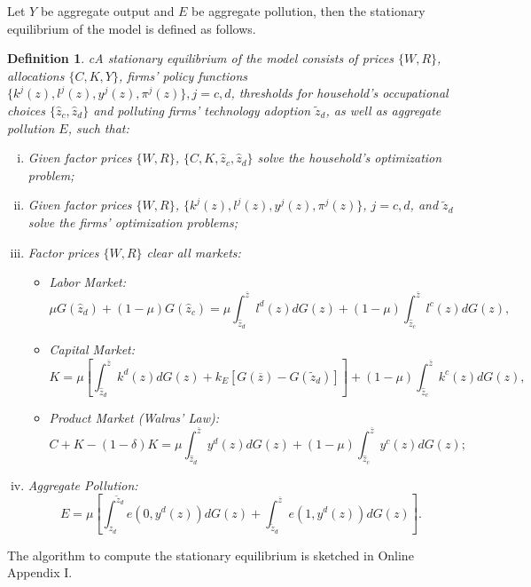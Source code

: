 \documentclass[AEJ]{AEA}
\newtheorem{definition}{Definition}
\begin{document}
Let $Y$ be aggregate output and $E$ be aggregate pollution, then the stationary equilibrium of the model is defined as follows.
\begin{definition}
\label{def:ge}
cA stationary equilibrium of the model consists of prices $\{W, R \}$, allocations $\{C, K, Y \}$, firms' policy functions $\{k^j(z),l^j(z),y^j(z),\pi^j(z)\}, j = c,d$, thresholds for household's occupational choices $\{\hat{z}_c, \hat{z}_d\}$ and polluting firms' technology adoption $\tilde{z}_d$, as well as aggregate pollution $E$, such that:
\begin{enumerate}[(i)]
    \item
    Given factor prices $\{W, R\}$, $\{C, K, \hat{z}_c, \hat{z}_d\}$ solve the household's optimization problem;
    \item
    Given factor prices $\{W, R\}$, $\{k^j(z),l^j(z),y^j(z),\pi^j(z)\}$, $j = c,d$, and $\tilde{z}_d$ solve the firms' optimization problems;
    \item
    Factor prices $\{W, R\}$ clear all markets:
    \begin{itemize}
        \item
        Labor Market:
        \begin{equation*}
            \mu G(\hat{z}_d) + (1-\mu) G(\hat{z}_c) = \mu \int_{\hat{z}_d}^{\overline{z}} l^d(z)dG(z) + (1-\mu)\int_{\hat{z}_c}^{\overline{z}} l^c(z)dG(z),
        \end{equation*}
        \item
        Capital Market:
        \begin{equation*}
            K = \mu \left[\int_{\hat{z}_d}^{\overline{z}} k^d(z)dG(z) + k_E [G(\overline{z})-G(\tilde{z}_d)]\right] + (1-\mu)\int_{\hat{z}_c}^{\overline{z}} k^c(z)dG(z),
        \end{equation*}
        \item
        Product Market (Walras' Law):
        \begin{equation*}
            C + K - (1-\delta)K = \mu \int_{\hat{z}_d}^{\overline{z}} y^d(z)dG(z) + (1-\mu)\int_{\hat{z}_c}^{\overline{z}} y^c(z)dG(z);
        \end{equation*}
    \end{itemize}
    \item
    Aggregate Pollution:
    \begin{equation*}
        E = \mu\left[\int_{\hat{z}_d}^{\tilde{z}_d} e\left(0,y^d(z)\right)dG(z) + \int_{\tilde{z}_d}^{\overline{z}} e\left(1,y^d(z)\right) dG(z)\right].
    \end{equation*}
\end{enumerate}
\end{definition}
\noindent The algorithm to compute the stationary equilibrium is sketched in Online Appendix I.
\end{document}

